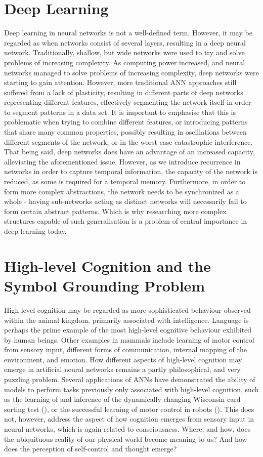 \section{Deep Learning}

Deep learning in neural networks is not a well-defined term. However, it may be regarded as when networks consist of several layers, resulting in a deep neural network.
Traditionally, shallow, but wide networks were used to try and solve problems of increasing complexity.
As computing power increased, and neural networks managed to solve problems of increasing complexity, deep networks were starting to gain attention. However, more traditional ANN approaches still suffered from a lack of plasticity, resulting in different parts of deep networks representing different features, effectively segmenting the network itself in order to segment patterns in a data set. It is important to emphasise that this is problematic when trying to combine different features, or introducing patterns that share many common properties, possibly resulting in oscillations between different segments of the network, or in the worst case catastrophic interference.
That being said, deep networks does have an advantage of an increased capacity, alleviating the aforementioned issue. However, as we introduce recurrence in networks in order to capture temporal information, the capacity of the network is reduced, as some is required for a temporal memory. Furthermore, in order to form more complex abstractions, the network needs to be synchronized as a whole - having sub-networks acting as distinct networks will necessarily fail to form certain abstract patterns. Which is why researching more complex structures capable of such generalisation is a problem of central importance in deep learning today.


\section{High-level Cognition and the Symbol Grounding Problem}

High-level cognition may be regarded as more sophisticated behaviour observed within the animal kingdom, primarily associated with intelligence. Language is perhaps the prime example of the most high-level cognitive behaviour exhibited by human beings. Other examples in mammals include learning of motor control from sensory input, different forms of communication, internal mapping of the environment, and emotion.
How different aspects of high-level cognition may emerge in artificial neural networks remains a partly philosophical, and very puzzling problem. Several applications of ANNs have demonstrated the ability of models to perform tasks previously only associated with high-level cognition, such as the learning of and inference of the dynamically changing Wisconsin card sorting test (\cite{Maniadakis2012}), or the successful learning of motor control in robots (\cite{Sugita2005, Yamashita2008, Tani2014}). 
This does not, however, address the aspect of how cognition emerges from sensory input in neural networks, which is again related to consciousness. 
Where, and how, does the ubiquituous reality of our physical world become meaning to us? And how does the perception of self-control and thought emerge?

